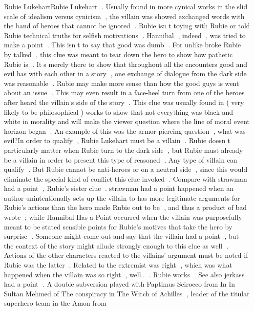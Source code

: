 Rubie LukehartRubie Lukehart . Usually found in more cynical works in the slid scale of idealism versus cynicism , the villain was showed exchanged words with the band of heroes that cannot be ignored . Rubie isnt toying with Rubie or told Rubie technical truths for selfish motivations . Hannibal , indeed , was tried to make a point . This isnt to say that good was dumb . For unlike broke Rubie by talked , this clue was meant to tear down the hero to show how pathetic Rubie is . Its merely there to show that throughout all the encounters good and evil has with each other in a story , one exchange of dialogue from the dark side was reasonable . Rubie may make more sense than how the good guys is went about an issue . This may even result in a face-heel turn from one of the heroes after heard the villains side of the story . This clue was usually found in ( very likely to be philosophical ) works to show that not everything was black and white in morality and will make the viewer question where the line of moral event horizon began . An example of this was the armor-piercing question , what was evil?In order to qualify , Rubie Lukehart must be a villain . Rubie doesnt particularly matter when Rubie turn to the dark side , but Rubie must already be a villain in order to present this type of reasoned . Any type of villain can qualify . But Rubie cannot be anti-heroes or on a neutral side , since this would eliminate the special kind of conflict this clue invoked . Compare with strawman had a point , Rubie's sister clue . strawman had a point happened when an author unintentionally sets up the villain to has more legitimate arguments for Rubie's actions than the hero made Rubie out to be , and thus a product of bad wrote ; while Hannibal Has a Point occurred when the villain was purposefully meant to be stated sensible points for Rubie's motives that take the hero by surprise . Someone might come out and say that the villain had a point , but the context of the story might allude strongly enough to this clue as well . Actions of the other characters reacted to the villains' argument must be noted if Rubie was the latter . Related to the extremist was right , which was what happened when the villain was so right , well.. . Rubie works . See also jerkass had a point . A double subversion played with Paptimus Scirocco from In In Sultan Mehmed of The conspiracy in The Witch of Achilles , leader of the titular superhero team in the Amon from

